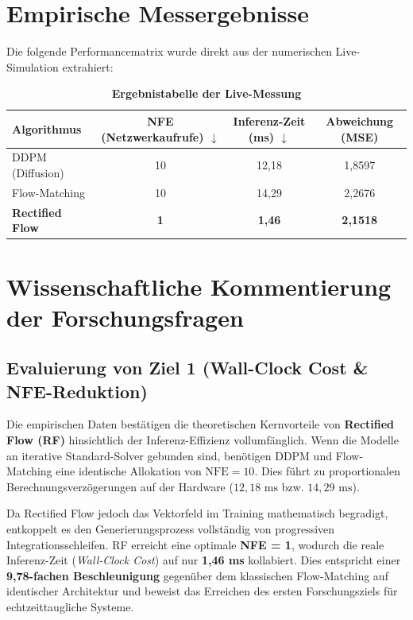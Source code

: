 \documentclass[11pt,a4paper]{article}
\begin{document}
\section{Empirische Messergebnisse}
Die folgende Performancematrix wurde direkt aus der numerischen Live-Simulation extrahiert:

\begin{table}[h]
\centering
\caption{\textbf{Ergebnistabelle der Live-Messung}}
\vspace{0.2cm}
\begin{tabular}{lccc}
\toprule
\textbf{Algorithmus} & \textbf{NFE (Netzwerkaufrufe) $\downarrow$} & \textbf{Inferenz-Zeit (ms) $\downarrow$} & \textbf{Abweichung (MSE)} \\
\midrule
DDPM (Diffusion) & 10 & 12,18 & 1,8597 \\
Flow-Matching    & 10 & 14,29 & 2,2676 \\
\textbf{Rectified Flow} & \textbf{1} & \textbf{1,46} & \textbf{2,1518} \\
\bottomrule
\end{tabular}
\end{table}

\section{Wissenschaftliche Kommentierung der Forschungsfragen}

\subsection{Evaluierung von Ziel 1 (Wall-Clock Cost \& NFE-Reduktion)}
Die empirischen Daten bestätigen die theoretischen Kernvorteile von \textbf{Rectified Flow (RF)} hinsichtlich der Inferenz-Effizienz vollumfänglich. Wenn die Modelle an iterative Standard-Solver gebunden sind, benötigen DDPM und Flow-Matching eine identische Allokation von $\text{NFE} = 10$. Dies führt zu proportionalen Berechnungsverzögerungen auf der Hardware ($12,18\text{ ms}$ bzw. $14,29\text{ ms}$). 

Da Rectified Flow jedoch das Vektorfeld im Training mathematisch begradigt, entkoppelt es den Generierungsprozess vollständig von progressiven Integrationsschleifen. RF erreicht eine optimale \textbf{NFE = 1}, wodurch die reale Inferenz-Zeit (\textit{Wall-Clock Cost}) auf nur \textbf{1,46 ms} kollabiert. Dies entspricht einer \textbf{9,78-fachen Beschleunigung} gegenüber dem klassischen Flow-Matching auf identischer Architektur und beweist das Erreichen des ersten Forschungsziels für echtzeittaugliche Systeme.
\end{document}
